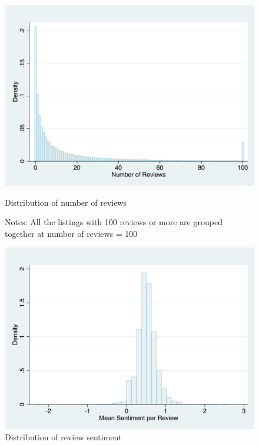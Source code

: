 \begin{figure}\centering
	\includegraphics[width=.8\textwidth]{figures/num_reviews_dist-DISC-100}
	\caption{Distribution of number of reviews}
	\caption*{Notes: All the listings with 100 reviews or more are grouped together at number of reviews = 100}
	\label{fig:reviews}
\end{figure}

\begin{figure}\centering
	\includegraphics[width=.8\textwidth]{figures/review_sentiment_dist}
	\caption{Distribution of review sentiment}
	\label{fig:sentiment}
\end{figure}



% 









